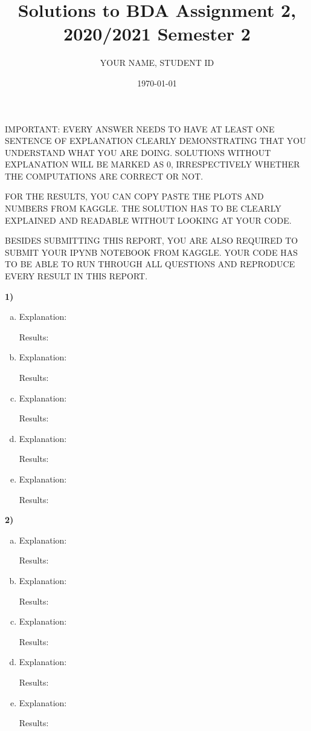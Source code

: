 \documentclass[12pt,a4paper]{article}
\begin{document}
\title{Solutions to BDA Assignment 2,
 2020/2021 Semester 2}
\author{ YOUR NAME, STUDENT ID}
\date{\today}
\maketitle

IMPORTANT: EVERY ANSWER NEEDS TO HAVE AT LEAST ONE SENTENCE OF EXPLANATION CLEARLY DEMONSTRATING THAT YOU UNDERSTAND WHAT YOU ARE DOING.
SOLUTIONS WITHOUT EXPLANATION WILL BE MARKED AS 0, IRRESPECTIVELY WHETHER THE COMPUTATIONS ARE CORRECT OR NOT.

FOR THE RESULTS, YOU CAN COPY PASTE THE PLOTS AND NUMBERS FROM KAGGLE. THE SOLUTION HAS TO BE CLEARLY EXPLAINED AND READABLE WITHOUT LOOKING AT YOUR CODE.

BESIDES SUBMITTING THIS REPORT, YOU ARE ALSO REQUIRED TO SUBMIT YOUR IPYNB NOTEBOOK FROM KAGGLE. YOUR CODE HAS TO BE ABLE TO RUN THROUGH ALL QUESTIONS AND REPRODUCE EVERY RESULT IN THIS REPORT.

\vspace{1cm}

\noindent\textbf{1)}
\begin{enumerate}[(a)]
\item
Explanation:

Results:

\item
Explanation:

Results:

\item
Explanation:

Results:

\item
Explanation:

Results:

\item
Explanation:

Results:

\end{enumerate}

\noindent\textbf{2)}
\begin{enumerate}[(a)]
\item
Explanation:

Results:

\item
Explanation:

Results:

\item
Explanation:

Results:

\item
Explanation:

Results:

\item
Explanation:

Results:


\end{enumerate}
\end{document}
